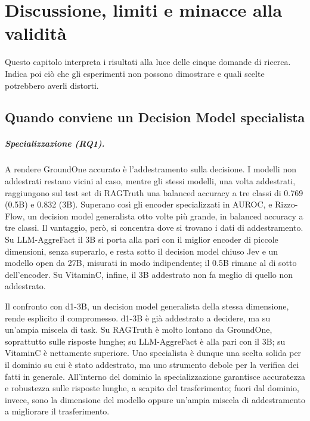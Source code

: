\chapter{Discussione, limiti e minacce alla validità}
\label{sec:discussion}


Questo capitolo interpreta i risultati alla luce delle cinque domande di ricerca. Indica poi ciò che gli esperimenti non
possono dimostrare e quali scelte potrebbero averli distorti.

\section{Quando conviene un Decision Model specialista}
\label{sec:disc-synthesis}

\paragraph{Specializzazione (RQ1).} A rendere GroundOne accurato è l'addestramento sulla decisione. I modelli non
addestrati restano vicini al caso, mentre gli stessi modelli, una volta addestrati, raggiungono sul test set di RAGTruth
una balanced accuracy a tre classi di 0.769 (0.5B) e 0.832 (3B). Superano così gli encoder specializzati in AUROC, e
Rizzo-Flow, un decision model generalista otto volte più grande, in balanced accuracy a tre classi. Il vantaggio, però, si
concentra dove si trovano i dati di addestramento. Su LLM-AggreFact il 3B si porta alla pari con il miglior encoder di
piccole dimensioni, senza superarlo, e resta sotto il decision model chiuso Jev e un modello open da 27B, misurati in modo
indipendente; il 0.5B rimane al di sotto dell'encoder. Su VitaminC, infine, il 3B addestrato non fa meglio di quello non
addestrato.

Il confronto con d1-3B, un decision model generalista della stessa dimensione, rende esplicito il compromesso. d1-3B è già
addestrato a decidere, ma su un'ampia miscela di task. Su RAGTruth è molto lontano da GroundOne, soprattutto sulle
risposte lunghe; su LLM-AggreFact è alla pari con il 3B; su VitaminC è nettamente superiore. Uno specialista è dunque una
scelta solida per il dominio su cui è stato addestrato, ma uno strumento debole per la verifica dei fatti in generale.
All'interno del dominio la specializzazione garantisce accuratezza e robustezza sulle risposte lunghe, a scapito del
trasferimento; fuori dal dominio, invece, sono la dimensione del modello oppure un'ampia miscela di addestramento a
migliorare il trasferimento.

